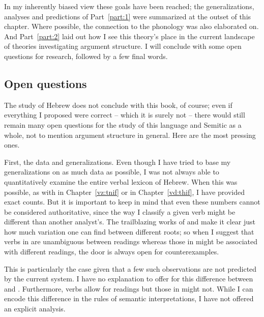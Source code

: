 \begin{exe}
\begin{xlist}
\begin{xlist}
\begin{xlist}
\begin{xlist}
\begin{xlist}
\begin{xlist}
\begin{exe}
\begin{xlist}
\begin{exe}
\begin{exe}
\begin{xlist}
\begin{exe}
\begin{exe}
\begin{xlist}
\begin{exe}
\begin{xlist}
\begin{exe}
\begin{xlist}
\begin{exe}
\begin{xlist}
\begin{exe}
\begin{xlist}
\begin{exe}
\begin{xlist}
\begin{exe}
\begin{xlist}
\begin{exe}
\begin{xlist}
\begin{exe}
\begin{xlist}
\begin{exe}
\begin{xlist}
\begin{exe}
\begin{xlist}
In my inherently biased view these goals have been reached; the generalizations, analyses and predictions of Part~\ref{part:1} were summarized at the outset of this chapter. Where possible, the connection to the phonology was also elaborated on. And Part~\ref{part:2} laid out how I see this theory's place in the current landscape of theories investigating argument structure. I will conclude with some open questions for research, followed by a few final words.

	\subsection{Open questions}
The study of Hebrew does not conclude with this book, of course; even if everything I proposed were correct -- which it is surely not -- there would still remain many open questions for the study of this language and Semitic as a whole, not to mention argument structure in general. Here are the most pressing ones.

First, the data and generalizations. Even though I have tried to base my generalizations on as much data as possible, I was not always able to quantitatively examine the entire verbal lexicon of Hebrew. When this was possible, as with {\tnif} in Chapter~\ref{vz:tnif} or {\thif} in Chapter~\ref{vd:thif}, I have provided exact counts. But it is important to keep in mind that even these numbers cannot be considered authoritative, since the way I classify a given verb might be different than another analyst's. The trailblazing works of \cite{doron03} and \cite{arad05} make it clear just how much variation one can find between different roots; so when I suggest that verbs in {\thit} are unambiguous between readings whereas those in {\tnif} might be associated with different readings, the door is always open for counterexamples.

This is particularly the case given that a few such observations are not predicted by the current system. I have no explanation to offer for this difference between {\thit} and {\tnif}. Furthermore, {\tnif} verbs allow for  readings but those in {\thit} might not. While I can encode this difference in the rules of semantic interpretations, I have not offered an explicit analysis.


\end{xlist}
\end{exe}
\end{xlist}
\end{exe}
\end{xlist}
\end{exe}
\end{xlist}
\end{exe}
\end{xlist}
\end{exe}
\end{xlist}
\end{exe}
\end{xlist}
\end{exe}
\end{xlist}
\end{exe}
\end{xlist}
\end{exe}
\end{xlist}
\end{exe}
\end{xlist}
\end{exe}
\end{exe}
\end{xlist}
\end{exe}
\end{exe}
\end{xlist}
\end{exe}
\end{xlist}
\end{xlist}
\end{xlist}
\end{xlist}
\end{xlist}
\end{xlist}
\end{exe}
